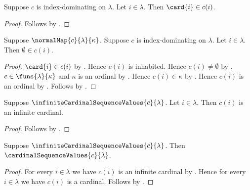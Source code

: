 \begin{proposition}\label{index_dominating_value}
    Suppose $c$ is index-dominating on $\lambda$.
    Let $i\in\lambda$.
    Then $\card{i}\in c(i)$.
\end{proposition}
\begin{proof}
    Follows by .
\end{proof}

\begin{proposition}\label{index_dominating_normal_map_value_contains_zero}
    Suppose $\normalMap{c}{\lambda}{\kappa}$.
    Suppose $c$ is index-dominating on $\lambda$.
    Let $i\in\lambda$.
    Then $\emptyset\in c(i)$.
\end{proposition}
\begin{proof}
    $\card{i}\in c(i)$ by .
    Hence $c(i)$ is inhabited.
    Hence $c(i)\neq\emptyset$ by .
    $c\in\funs{\lambda}{\kappa}$ and $\kappa$ is an ordinal
        by .
    Hence $c(i)\in\kappa$ by .
    Hence $c(i)$ is an ordinal by .
    Follows by .
\end{proof}

\begin{proposition}\label{infinite_cardinal_sequence_value}
    Suppose $\infiniteCardinalSequenceValues{c}{\lambda}$.
    Let $i\in\lambda$.
    Then $c(i)$ is an infinite cardinal.
\end{proposition}
\begin{proof}
    Follows by .
\end{proof}

\begin{proposition}\label{infinite_cardinal_sequence_values_are_cardinal_values}
    Suppose $\infiniteCardinalSequenceValues{c}{\lambda}$.
    Then $\cardinalSequenceValues{c}{\lambda}$.
\end{proposition}
\begin{proof}
    For every $i\in\lambda$ we have $c(i)$ is an infinite cardinal
        by .
    Hence for every $i\in\lambda$ we have $c(i)$ is a cardinal.
    Follows by .
\end{proof}
